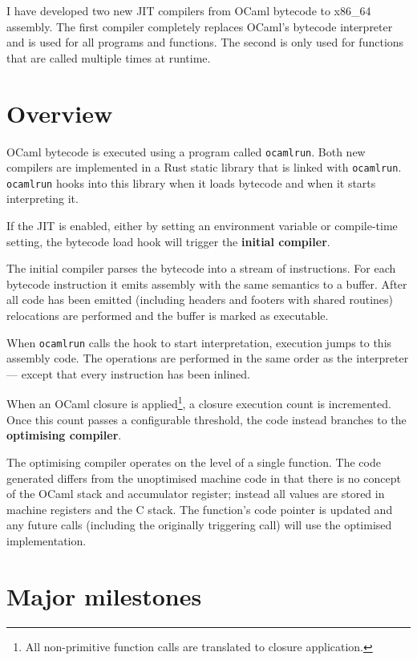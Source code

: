 I have developed two new JIT compilers from OCaml bytecode to x86\_64 assembly. The first compiler
completely replaces OCaml's bytecode interpreter and
is used for all programs and functions. The second is only used for functions that are called
multiple times at runtime.

\section{Overview}

OCaml bytecode is executed using a program called \texttt{ocamlrun}. Both new compilers are
implemented in a Rust static library that is linked with \texttt{ocamlrun}. \texttt{ocamlrun}
hooks into
this library when it loads bytecode and when it starts interpreting it.

If the JIT is enabled, either by setting an environment variable or compile-time setting, the
bytecode load hook will trigger the \textbf{initial compiler}.

The initial compiler parses the bytecode into a stream of instructions. For each bytecode
instruction it emits assembly with the same semantics to a buffer. After all code has been emitted
(including headers and footers with shared routines) relocations are performed and the buffer is
marked as executable.

When \texttt{ocamlrun} calls the hook to start interpretation, execution jumps to
this assembly code. The operations are performed in the same order as the interpreter --- except
that every
instruction has been inlined.

When an OCaml closure is applied\footnote{All non-primitive function calls are translated to
      closure application.}, a closure execution count is incremented. Once this count passes a
configurable
threshold, the code instead branches to the \textbf{optimising compiler}.

The optimising compiler operates on the level of a single function. The code generated differs from
the unoptimised machine code in that there is no concept of the OCaml stack and accumulator
register; instead all values are stored in machine registers and the C stack. The function's code
pointer is updated and any
future calls (including the originally triggering call) will use the optimised implementation.

\section{Major milestones}

